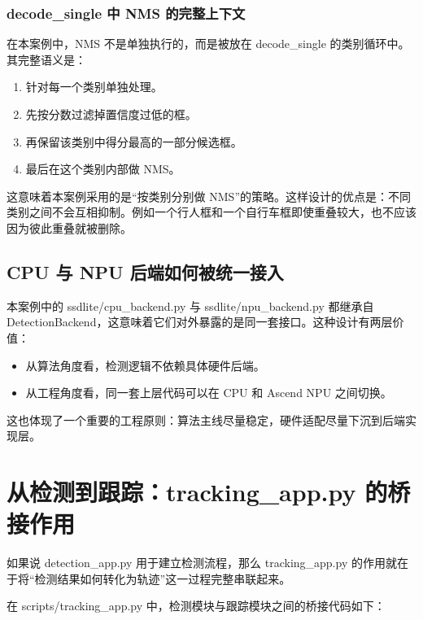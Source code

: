\subsubsection{decode\_single 中 NMS
的完整上下文}\label{src-experiment-case2-h37}

在本案例中，NMS 不是单独执行的，而是被放在 decode\_single
的类别循环中。其完整语义是：

\begin{enumerate}
\def\labelenumi{\arabic{enumi}.}
\tightlist
\item
  针对每一个类别单独处理。
\item
  先按分数过滤掉置信度过低的框。
\item
  再保留该类别中得分最高的一部分候选框。
\item
  最后在这个类别内部做 NMS。
\end{enumerate}

这意味着本案例采用的是``按类别分别做
NMS''的策略。这样设计的优点是：不同类别之间不会互相抑制。例如一个行人框和一个自行车框即使重叠较大，也不应该因为彼此重叠就被删除。

\subsection{CPU 与 NPU
后端如何被统一接入}\label{src-experiment-case2-h38}

本案例中的 ssdlite/cpu\_backend.py 与 ssdlite/npu\_backend.py 都继承自
DetectionBackend，这意味着它们对外暴露的是同一套接口。这种设计有两层价值：

\begin{itemize}
\tightlist
\item
  从算法角度看，检测逻辑不依赖具体硬件后端。
\item
  从工程角度看，同一套上层代码可以在 CPU 和 Ascend NPU 之间切换。
\end{itemize}

这也体现了一个重要的工程原则：算法主线尽量稳定，硬件适配尽量下沉到后端实现层。

\section{从检测到跟踪：tracking\_app.py
的桥接作用}\label{src-experiment-case2-h39}

如果说 detection\_app.py 用于建立检测流程，那么 tracking\_app.py
的作用就在于将``检测结果如何转化为轨迹''这一过程完整串联起来。

在 scripts/tracking\_app.py 中，检测模块与跟踪模块之间的桥接代码如下：

